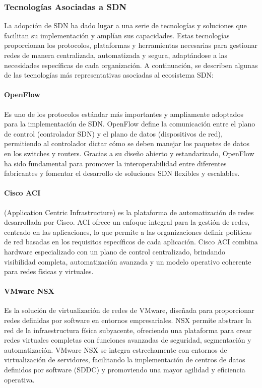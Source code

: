 {        \subsubsection{Tecnologías Asociadas a SDN}
            La adopción de SDN ha dado lugar a una serie de tecnologías y soluciones que facilitan su implementación y amplían sus capacidades. Estas tecnologías proporcionan los protocolos, plataformas y herramientas necesarias para gestionar redes de manera centralizada, automatizada y segura, adaptándose a las necesidades específicas de cada organización. A continuación, se describen algunas de las tecnologías más representativas asociadas al ecosistema SDN:
            
            \paragraph{OpenFlow} Es uno de los protocolos estándar más importantes y ampliamente adoptados para la implementación de SDN. OpenFlow define la comunicación entre el plano de control (controlador SDN) y el plano de datos (dispositivos de red), permitiendo al controlador dictar cómo se deben manejar los paquetes de datos en los switches y routers. Gracias a su diseño abierto y estandarizado, OpenFlow ha sido fundamental para promover la interoperabilidad entre diferentes fabricantes y fomentar el desarrollo de soluciones SDN flexibles y escalables.
            
            \paragraph{Cisco ACI} (Application Centric Infrastructure) es la plataforma de automatización de redes desarrollada por Cisco. ACI ofrece un enfoque integral para la gestión de redes, centrado en las aplicaciones, lo que permite a las organizaciones definir políticas de red basadas en los requisitos específicos de cada aplicación. Cisco ACI combina hardware especializado con un plano de control centralizado, brindando visibilidad completa, automatización avanzada y un modelo operativo coherente para redes físicas y virtuales.
            
            \paragraph{VMware NSX} Es la solución de virtualización de redes de VMware, diseñada para proporcionar redes definidas por software en entornos empresariales. NSX permite abstraer la red de la infraestructura física subyacente, ofreciendo una plataforma para crear redes virtuales completas con funciones avanzadas de seguridad, segmentación y automatización. VMware NSX se integra estrechamente con entornos de virtualización de servidores, facilitando la implementación de centros de datos definidos por software (SDDC) y promoviendo una mayor agilidad y eficiencia operativa.
        
}

